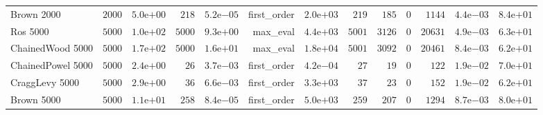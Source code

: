\begin{longtable}[c]{lrrrrrrrrrrrr}
Brown 2000 & \( 2000\) & \( 5.0\)e\(+00\) & \(  218\) & \( 5.2\)e\(-05\) & first\_order & \( 2.0\)e\(+03\) & \(  219\) & \(  185\) & \(    0\) & \( 1144\) & \( 4.4\)e\(-03\) & \( 8.4\)e\(+01\) \\
Ros 5000 & \( 5000\) & \( 1.0\)e\(+02\) & \( 5000\) & \( 9.3\)e\(+00\) & max\_eval & \( 4.4\)e\(+03\) & \( 5001\) & \( 3126\) & \(    0\) & \(20631\) & \( 4.9\)e\(-03\) & \( 6.3\)e\(+01\) \\
ChainedWood 5000 & \( 5000\) & \( 1.7\)e\(+02\) & \( 5000\) & \( 1.6\)e\(+01\) & max\_eval & \( 1.8\)e\(+04\) & \( 5001\) & \( 3092\) & \(    0\) & \(20461\) & \( 8.4\)e\(-03\) & \( 6.2\)e\(+01\) \\
ChainedPowel 5000 & \( 5000\) & \( 2.4\)e\(+00\) & \(   26\) & \( 3.7\)e\(-03\) & first\_order & \( 4.2\)e\(-04\) & \(   27\) & \(   19\) & \(    0\) & \(  122\) & \( 1.9\)e\(-02\) & \( 7.0\)e\(+01\) \\
CraggLevy 5000 & \( 5000\) & \( 2.9\)e\(+00\) & \(   36\) & \( 6.6\)e\(-03\) & first\_order & \( 3.3\)e\(+03\) & \(   37\) & \(   23\) & \(    0\) & \(  152\) & \( 1.9\)e\(-02\) & \( 6.2\)e\(+01\) \\
Brown 5000 & \( 5000\) & \( 1.1\)e\(+01\) & \(  258\) & \( 8.4\)e\(-05\) & first\_order & \( 5.0\)e\(+03\) & \(  259\) & \(  207\) & \(    0\) & \( 1294\) & \( 8.7\)e\(-03\) & \( 8.0\)e\(+01\) \\
\hline 
\end{longtable}



